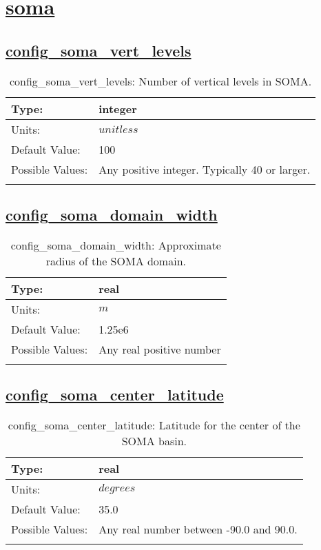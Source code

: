 \section[soma]{\hyperref[sec:nm_tab_soma]{soma}}
\label{sec:nm_sec_soma}
\subsection[config\_soma\_vert\_levels]{\hyperref[sec:nm_tab_soma]{config\_soma\_vert\_levels}}
\label{subsec:nm_sec_config_soma_vert_levels}
\begin{center}
\begin{longtable}{| p{2.0in} || p{4.0in} |}
    \hline
    Type: & integer \\
    \hline
    Units: & $unitless$ \\
    \hline
    Default Value: & 100 \\
    \hline
    Possible Values: & Any positive integer. Typically 40 or larger. \\
    \hline
    \caption{config\_soma\_vert\_levels: Number of vertical levels in SOMA.}
\end{longtable}
\end{center}
\subsection[config\_soma\_domain\_width]{\hyperref[sec:nm_tab_soma]{config\_soma\_domain\_width}}
\label{subsec:nm_sec_config_soma_domain_width}
\begin{center}
\begin{longtable}{| p{2.0in} || p{4.0in} |}
    \hline
    Type: & real \\
    \hline
    Units: & $m$ \\
    \hline
    Default Value: & 1.25e6 \\
    \hline
    Possible Values: & Any real positive number \\
    \hline
    \caption{config\_soma\_domain\_width: Approximate radius of the SOMA domain.}
\end{longtable}
\end{center}
\subsection[config\_soma\_center\_latitude]{\hyperref[sec:nm_tab_soma]{config\_soma\_center\_latitude}}
\label{subsec:nm_sec_config_soma_center_latitude}
\begin{center}
\begin{longtable}{| p{2.0in} || p{4.0in} |}
    \hline
    Type: & real \\
    \hline
    Units: & $degrees$ \\
    \hline
    Default Value: & 35.0 \\
    \hline
    Possible Values: & Any real number between -90.0 and 90.0. \\
    \hline
    \caption{config\_soma\_center\_latitude: Latitude for the center of the SOMA basin.}
\end{longtable}
\end{center}
